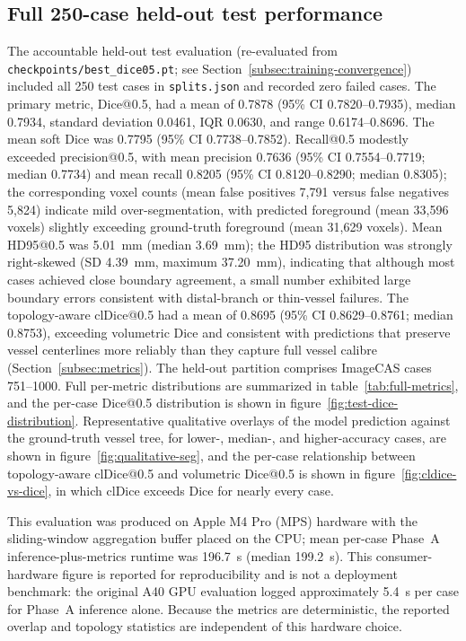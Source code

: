 \documentclass[anonymous]{iopjournal}
\begin{document}
\subsection{Full 250-case held-out test performance}

The accountable held-out test evaluation (re-evaluated from \texttt{checkpoints/best\_dice05.pt}; see Section~\ref{subsec:training-convergence}) included all 250 test cases in \texttt{splits.json} and recorded zero failed cases. The primary metric, Dice@0.5, had a mean of 0.7878 (95\% CI 0.7820--0.7935), median 0.7934, standard deviation 0.0461, IQR 0.0630, and range 0.6174--0.8696. The mean soft Dice was 0.7795 (95\% CI 0.7738--0.7852). Recall@0.5 modestly exceeded precision@0.5, with mean precision 0.7636 (95\% CI 0.7554--0.7719; median 0.7734) and mean recall 0.8205 (95\% CI 0.8120--0.8290; median 0.8305); the corresponding voxel counts (mean false positives 7{,}791 versus false negatives 5{,}824) indicate mild over-segmentation, with predicted foreground (mean 33{,}596 voxels) slightly exceeding ground-truth foreground (mean 31{,}629 voxels). Mean HD95@0.5 was \SI{5.01}{mm} (median \SI{3.69}{mm}); the HD95 distribution was strongly right-skewed (SD \SI{4.39}{mm}, maximum \SI{37.20}{mm}), indicating that although most cases achieved close boundary agreement, a small number exhibited large boundary errors consistent with distal-branch or thin-vessel failures. The topology-aware clDice@0.5 had a mean of 0.8695 (95\% CI 0.8629--0.8761; median 0.8753), exceeding volumetric Dice and consistent with predictions that preserve vessel centerlines more reliably than they capture full vessel calibre (Section~\ref{subsec:metrics}). The held-out partition comprises ImageCAS cases 751--1000. Full per-metric distributions are summarized in table~\ref{tab:full-metrics}, and the per-case Dice@0.5 distribution is shown in figure~\ref{fig:test-dice-distribution}. Representative qualitative overlays of the model prediction against the ground-truth vessel tree, for lower-, median-, and higher-accuracy cases, are shown in figure~\ref{fig:qualitative-seg}, and the per-case relationship between topology-aware clDice@0.5 and volumetric Dice@0.5 is shown in figure~\ref{fig:cldice-vs-dice}, in which clDice exceeds Dice for nearly every case.

This evaluation was produced on Apple M4 Pro (MPS) hardware with the sliding-window aggregation buffer placed on the CPU; mean per-case Phase~A inference-plus-metrics runtime was \SI{196.7}{s} (median \SI{199.2}{s}). This consumer-hardware figure is reported for reproducibility and is not a deployment benchmark: the original A40 GPU evaluation logged approximately \SI{5.4}{s} per case for Phase~A inference alone. Because the metrics are deterministic, the reported overlap and topology statistics are independent of this hardware choice.
\end{document}
